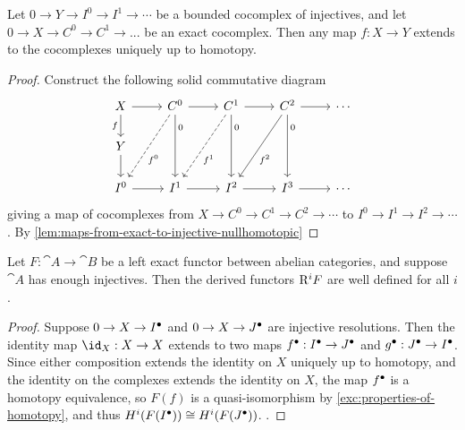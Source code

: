 \begin{cor}\label{cor:extend-map-exact-complex-to-complex-of-injectives}
	Let $0 \to Y \to I^0 \to I^1 \to \cdots$ be a bounded cocomplex of injectives, and let $0 \to X \to C^0 \to C^1 \to ...$ be an exact cocomplex. Then any map $f: X \to Y$ extends to the cocomplexes uniquely up to homotopy. 
\end{cor}
\begin{proof}
Construct the following solid commutative diagram 	
\[\begin{tikzcd}
	X & {C^0} & {C^1} & {C^2} & \cdots \\
	Y \\
	{I^0} & {I^1} & {I^2} & {I^3} & \cdots
	\arrow[from=1-1, to=1-2]
	\arrow["f"', from=1-1, to=2-1]
	\arrow[from=1-2, to=1-3]
	\arrow["{f^0}"{pos=0.6}, dashed, from=1-2, to=3-1]
	\arrow["0"{pos=0.2}, from=1-2, to=3-2]
	\arrow[from=1-3, to=1-4]
	\arrow["{f^1}"{pos=0.6}, dashed, from=1-3, to=3-2]
	\arrow["0"{pos=0.2}, from=1-3, to=3-3]
	\arrow[from=1-4, to=1-5]
	\arrow["{f^2}"{pos=0.6}, from=1-4, to=3-3]
	\arrow["0"{pos=0.2}, from=1-4, to=3-4]
	\arrow[from=2-1, to=3-1]
	\arrow[from=3-1, to=3-2]
	\arrow[from=3-2, to=3-3]
	\arrow[from=3-3, to=3-4]
	\arrow[from=3-4, to=3-5]
\end{tikzcd}\]
giving a map of cocomplexes from $X \to C^0 \to C^1 \to C^2 \to \cdots$ to $I^0 \to I^1 \to I^2 \to \cdots$. 
By \cref{lem:maps-from-exact-to-injective-nullhomotopic} 
\end{proof}

\begin{cor}
	Let $F: \cat A \to \cat B$ be a left exact functor between abelian categories, and suppose $\cat A$ has enough injectives. Then the derived functors $\mathrm{R}^iF$ are well defined for all $i$. 
\end{cor}
\begin{proof}
	Suppose $0 \to X \to {I}^\bullet$ and $0 \to X \to {J}^\bullet$ are injective resolutions. Then the identity map $\id_X: X \to X$ extends to two maps ${f}^\bullet: {I}^\bullet \to {J}^\bullet$ and ${g}^\bullet: {J}^\bullet \to {I}^\bullet$. Since either composition extends the identity on $X$ uniquely up to homotopy, and the identity on the complexes extends the identity on $X$, the map ${f}^\bullet$ is a homotopy equivalence, so $F(f)$ is a quasi-isomorphism by \cref{exc:properties-of-homotopy}, and thus $H^i(F({I}^\bullet)) \cong H^i(F({J}^\bullet))$. .
\end{proof}

